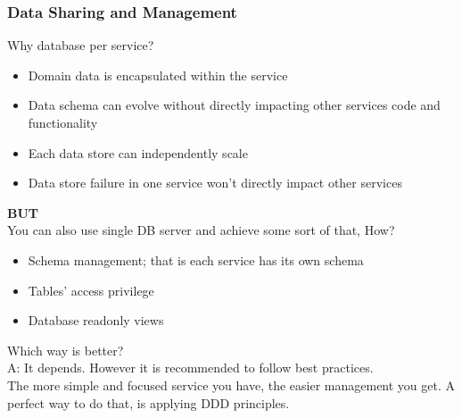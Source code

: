 \documentclass{beamer}
\begin{document}
		\begin{frame}
		\frametitle{Data Sharing and Management}
			Why database per service?
			\begin{itemize}
				\item \scriptsize{Domain data is encapsulated within the service }
				\item \scriptsize{Data schema can evolve without directly impacting other services code and functionality}
				\item \scriptsize{Each data store can independently scale}
				\item \scriptsize{Data store failure in one service won't directly impact other services}
			\end{itemize}
			
			\vspace{5mm}
			\textbf{BUT}\\
			\hspace{3mm} \scriptsize{You can also use single DB server and achieve some sort of that, How?}
			\begin{itemize}
				\item \scriptsize{Schema management; that is each service has its own schema}
				\item \scriptsize{Tables' access privilege}
				\item \scriptsize{Database readonly views}
			\end{itemize}
		
			\vspace{5mm}
				Which way is better? \\
					\hspace{3mm} \scriptsize {A: It depends. However it is recommended to follow best practices}.\\
					\hspace{3mm} \scriptsize {The more simple and focused service you have, the easier management you get. A perfect way to do that, is applying DDD principles}.
			\vspace{100mm}
		\end{frame}
	
\end{document}
